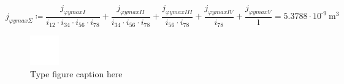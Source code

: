 \documentclass{article}
\newcommand{\defeq}{\coloneq} %
\begin{document}
\begin{equation*}
j_{φymaxΣ} \defeq \frac{j_{φymaxI}}{\textit{i}_{\textit{12}} \cdot \textit{i}_{\textit{34}} \cdot \textit{i}_{\textit{56}} \cdot \textit{i}_{\textit{78}}}+\frac{j_{φymaxII}}{\textit{i}_{\textit{34}} \cdot \textit{i}_{\textit{56}} \cdot \textit{i}_{\textit{78}}}+\frac{j_{φymaxIII}}{\textit{i}_{\textit{56}} \cdot \textit{i}_{\textit{78}}}+\frac{j_{φymaxIV}}{\textit{i}_{\textit{78}}}+\frac{j_{φymaxV}}{1} = {5.3788 \cdot 10^{ \operatorname{-} 9} \: \mathrm{m}^{3}}
\end{equation*}
\begin{figure}[h!]
 \begin{center}
  \includegraphics[max width=\textwidth]{calculations/917.png}
  \caption{Type figure caption here}
  \label{fig:917}
 \end{center}
\end{figure}
\end{document}
